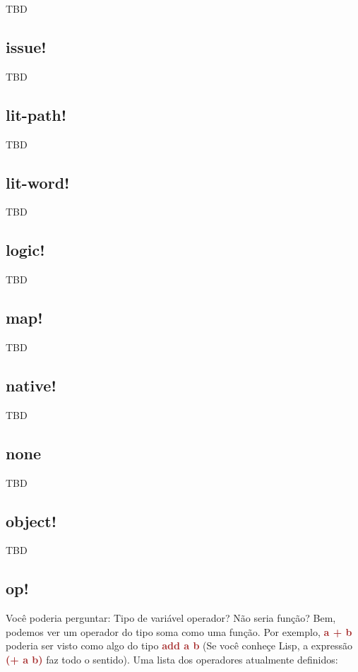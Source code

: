 \documentclass[12pt,a4paper]{article}
\newcommand{\codigo}[1]{\ttfamily\small\textcolor{Brown}{\textbf{#1}}\normalfont}
\begin{document}
TBD

\subsection{issue!}

TBD

\subsection{lit-path!}

TBD

\subsection{lit-word!}

TBD

\subsection{logic!}

TBD

\subsection{map!}

TBD

\subsection{native!}

TBD

\subsection{none}

TBD

\subsection{object!}

TBD

\subsection{op!}

Você poderia perguntar: Tipo de variável operador? Não seria função? Bem,
podemos ver um operador do tipo soma como uma função. Por exemplo, \codigo{a +
  b} poderia ser visto como algo do  tipo \codigo{add a b} (Se você conheçe
Lisp, a expressão \codigo{(+ a b)} faz todo o sentido). Uma lista dos operadores
atualmente definidos: 
\end{document}
